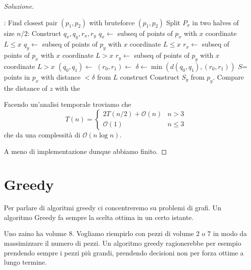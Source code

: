 \documentclass[11pt]{scrartcl}
\newcommand{\bigo}{\mathcal{O}}
\begin{document}
\begin{proof}[Soluzione]
\begin{algorithm}[Soluzione]
\begin{algorithmic}[1]
					:
						\State Find closest pair $(p_1,p_2)$ with bruteforce
						\State \Return $(p_1,p_2)$
					\EndIf
					\State Split $P_x$ in two halves of size $n/2$:
					\State Construct $q_x,q_y,r_x,r_y$
					\State $q_x\gets$ subseq of points of $p_x$ with $x$ coordinate $L\le x$
					\State $q_y\gets$ subseq of points of $p_y$ with $x$ coordinate $L\le x$
					\State $r_x\gets$ subseq of points of $p_x$ with $x$ coordinate $L> x$
					\State $r_y\gets$ subseq of points of $p_y$ with $x$ coordinate $L> x$
					\State $(q_0,q_1)\gets$ 
					\State $(r_0,r_1)\gets$ 
					\State $\delta\gets\min(d(q_0,q_1),(r_0,r_1))$
					\State $S$= points in $p_x$ with distance $<\delta$ from $L$ construct  
					\State Construct $S_y$ from $p_y$.
						\State Compare the distance of $z$ with the 
					\EndFor
				\EndFunction					
			\end{algorithmic}
			Facendo un'analisi temporale troviamo che 
			$$T(n)=
			\begin{cases}
				2T\left(n/2\right)+\bigo(n) & n>3 \\
				\bigo(1) & n\le 3
			\end{cases}
			$$
			che da una complessità di $\bigo(n\log n)$.
		\end{algorithm}
		A meno di implementazione dunque abbiamo finito.
	\end{proof}
	
	\newpage
	
	\section{Greedy}
	
	Per parlare di algoritmi greedy ci concentreremo su problemi di grafi. Un algoritmo Greedy fa sempre la scelta ottima in un certo istante. 
	\begin{example}
		Uno zaino ha volume $8$. Vogliamo riempirlo con pezzi di volume $2$ o $7$ in modo da massimizzare il numero di pezzi. Un algoritmo greedy ragionerebbe per esempio prendendo sempre i pezzi più grandi, prendendo decisioni non per forza ottime a lungo termine.
	\end{example}
	
\end{document}
